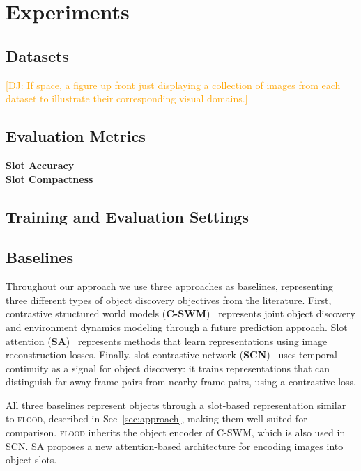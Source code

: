 \documentclass{article}
\newcommand{\jd}[1]{\textcolor{orange}{[DJ: #1]}}
\begin{document}
\section{Experiments}
\label{sec:experiments}

 

\subsection{Datasets}
\jd{If space, a figure up front just displaying a collection of images from each dataset to illustrate their corresponding visual domains.}

\subsection{Evaluation Metrics}
\textbf{Slot Accuracy}\\
\textbf{Slot Compactness}
\subsection{Training and Evaluation Settings}
\subsection{Baselines}

Throughout our approach we use three approaches as baselines, representing three different types of object discovery objectives from the literature. First, contrastive structured world models (\textbf{C-SWM})~\cite{kipf2019contrastive} represents joint object discovery and environment dynamics modeling through a future prediction approach. Slot attention (\textbf{SA})~\cite{locatello2020object} represents methods that learn representations using image reconstruction losses. Finally, slot-contrastive network (\textbf{SCN})~\cite{racah2020slot} uses temporal continuity as a signal for object discovery: it trains representations that can distinguish far-away frame pairs from nearby frame pairs, using a contrastive loss.  

All three baselines represent objects through a slot-based representation similar to \textsc{flood}, described in Sec~\ref{sec:approach}, making them well-suited for comparison. \textsc{flood} inherits the object encoder of C-SWM, which is also used in SCN. SA proposes a new attention-based architecture for encoding images into object slots.

\end{document}
